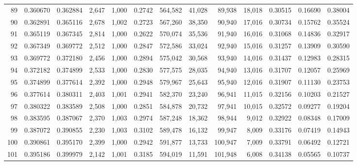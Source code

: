 \begin{tabular}{rrrrrrrrrrrrr}
89  &  0.360670 &  0.362884 &   2,647 &  1,000 &                                     0.2742 &  564,582 &   41,028 &   89,938 &   18,018 &  0.30515 &  0.16690 &  0.38004 \\
90  &  0.362891 &  0.365116 &   2,678 &  1,002 &                                     0.2723 &  567,260 &   38,350 &   90,940 &   17,016 &  0.30734 &  0.15762 &  0.35524 \\
91  &  0.365119 &  0.367345 &   2,814 &  1,000 &                                     0.2622 &  570,074 &   35,536 &   91,940 &   16,016 &  0.31068 &  0.14836 &  0.32917 \\
92  &  0.367349 &  0.369772 &   2,512 &  1,000 &                                     0.2847 &  572,586 &   33,024 &   92,940 &   15,016 &  0.31257 &  0.13909 &  0.30590 \\
93  &  0.369772 &  0.372180 &   2,456 &  1,000 &                                     0.2894 &  575,042 &   30,568 &   93,940 &   14,016 &  0.31437 &  0.12983 &  0.28315 \\
94  &  0.372182 &  0.374899 &   2,533 &  1,000 &                                     0.2830 &  577,575 &   28,035 &   94,940 &   13,016 &  0.31707 &  0.12057 &  0.25969 \\
95  &  0.374899 &  0.377614 &   2,392 &  1,000 &                                     0.2948 &  579,967 &   25,643 &   95,940 &   12,016 &  0.31907 &  0.11130 &  0.23753 \\
96  &  0.377614 &  0.380311 &   2,403 &  1,001 &                                     0.2941 &  582,370 &   23,240 &   96,941 &   11,015 &  0.32156 &  0.10203 &  0.21527 \\
97  &  0.380322 &  0.383589 &   2,508 &  1,000 &                                     0.2851 &  584,878 &   20,732 &   97,941 &   10,015 &  0.32572 &  0.09277 &  0.19204 \\
98  &  0.383595 &  0.387067 &   2,370 &  1,003 &                                     0.2974 &  587,248 &   18,362 &   98,944 &    9,012 &  0.32922 &  0.08348 &  0.17009 \\
99  &  0.387072 &  0.390855 &   2,230 &  1,003 &                                     0.3102 &  589,478 &   16,132 &   99,947 &    8,009 &  0.33176 &  0.07419 &  0.14943 \\
100 &  0.390861 &  0.395170 &   2,399 &  1,000 &                                     0.2942 &  591,877 &   13,733 &  100,947 &    7,009 &  0.33791 &  0.06492 &  0.12721 \\
101 &  0.395186 &  0.399979 &   2,142 &  1,001 &                                     0.3185 &  594,019 &   11,591 &  101,948 &    6,008 &  0.34138 &  0.05565 &  0.10737 \\

\end{tabular}
